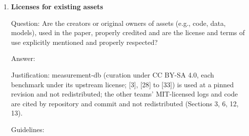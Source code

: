 \documentclass[
]{article}
\begin{document}
\begin{enumerate}
  Question: Does the paper describe safeguards that have been put in
  place for responsible release of data or models that have a high risk
  for misuse (e.g., pre-trained language models, image generators, or
  scraped datasets)?

  Answer: \answerNA{}

  Justification: No such asset is released; the predictor is a small
  statistical model.

  Guidelines:

  \begin{itemize}
  \item
    The answer \answerNA{} means that the paper poses no such risks.
  \item
    Released models that have a high risk for misuse or dual-use should
    be released with necessary safeguards to allow for controlled use of
    the model, for example by requiring that users adhere to usage
    guidelines or restrictions to access the model or implementing
    safety filters.
  \item
    Datasets that have been scraped from the Internet could pose safety
    risks. The authors should describe how they avoided releasing unsafe
    images.
  \item
    We recognize that providing effective safeguards is challenging, and
    many papers do not require this, but we encourage authors to take
    this into account and make a best faith effort.
  \end{itemize}
\item
  \textbf{Licenses for existing assets}

  Question: Are the creators or original owners of assets (e.g., code,
  data, models), used in the paper, properly credited and are the
  license and terms of use explicitly mentioned and properly respected?

  Answer: \answerYes{}

  Justification: measurement-db (curation under CC BY-SA 4.0, each
  benchmark under its upstream license; {[}3{]}, {[}28{]} to {[}33{]})
  is used at a pinned revision and not redistributed; the other teams'
  MIT-licensed logs and code are cited by repository and commit and not
  redistributed (Sections 3, 6, 12, 13).

  Guidelines:


\end{enumerate}
\end{document}
